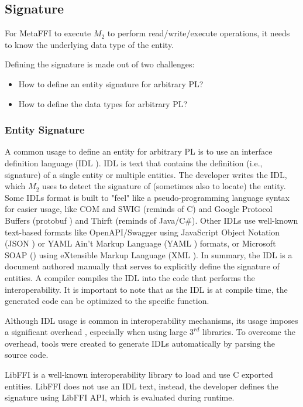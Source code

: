 \documentclass[sigplan,10pt,manuscript,nonacm]{acmart}
\begin{document}
\subsection{Signature}

For MetaFFI to execute $M_2$ to perform read/write/execute operations, it needs to know the underlying data type of the entity.

Defining the signature is made out of two challenges:
\begin{itemize}
    \item How to define an entity signature for arbitrary PL?
    \item How to define the data types for arbitrary PL?
\end{itemize}

\subsubsection{Entity Signature}
A common usage to define an entity for arbitrary PL is to use an interface definition language (IDL \cite{idl_wikipedia}). IDL is text that contains the definition (i.e., signature) of a single entity or multiple entities. The developer writes the IDL, which $M_2$ uses to detect the signature of (sometimes also to locate) the entity. Some IDLs format is built to "feel" like a pseudo-programming language syntax for easier usage, like COM and SWIG (reminds of C) and Google Protocol Buffers (protobuf \cite{protobuf_dev_guide}) and Thirft (reminds of Java/C\#). Other IDLs use well-known text-based formats like OpenAPI/Swagger \cite{openapi} using JavaScript Object Notation (JSON \cite{json_rfc}) or YAML Ain't Markup Language (YAML \cite{yaml_rfc}) formats, or Microsoft SOAP (\cite{soap_rfc}) using eXtensible Markup Language (XML \cite{xml_rfc}). In summary, the IDL is a document authored manually that serves to explicitly define the signature of entities. A compiler compiles the IDL into the code that performs the interoperability. It is important to note that as the IDL is at compile time, the generated code can be optimized to the specific function.

Although IDL usage is common in interoperability mechanisms, its usage imposes a significant overhead \cite{empirical_multi_lingual} \cite{polispin}, especially when using large $3^{rd}$ libraries. To overcome the overhead, tools were created to generate IDLs automatically by parsing the source code.

LibFFI \cite{libffi} is a well-known interoperability library to load and use C exported entities. LibFFI does not use an IDL text, instead, the developer defines the signature using LibFFI API, which is evaluated during runtime.
\end{document}
